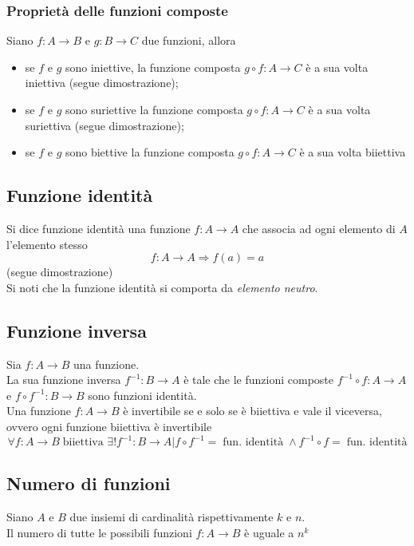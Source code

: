 \begin{flushleft}
\subsubsection{Proprietà delle funzioni composte}
Siano $f:A\to B$ e $g:B \to C$ due funzioni, allora
\begin{itemize}
    \item se $f$ e $g$ sono iniettive, la funzione composta $g\circ f:A\to C$ è a sua volta iniettiva (segue dimostrazione);
    \\ \vspace{300px}
    \item se $f$ e $g$ sono suriettive la funzione composta $g\circ f:A\to C$ è a sua volta suriettiva (segue dimostrazione);
    \\ \vspace{300px}
    \item se $f$ e $g$ sono biettive la funzione composta $g\circ f:A\to C$ è a sua volta biiettiva
\end{itemize}

\subsection{Funzione identità}
Si dice funzione identità una funzione $f:A\to A$ che associa ad ogni elemento di $A$ l'elemento stesso
\[f:A\to A \Rightarrow f(a) = a\]
(segue dimostrazione)
\\ \vspace{300px}
Si noti che la funzione identità si comporta da \textit{elemento neutro}.

\subsection{Funzione inversa}
Sia $f:A\to B$ una funzione.\\
La sua funzione inversa $f^{-1}: B\to A$ è tale che le funzioni composte $f^{-1}\circ f:A\to A$ e  $f\circ f^{-1}:B\to B$ sono funzioni identità.\\
Una funzione $f:A\to B$ è invertibile se e solo se è biiettiva e vale il viceversa, ovvero ogni funzione biiettiva è invertibile
\[\forall f:A\to B\;\text{biiettiva } \exists!f^{-1}:B\to A|f\circ f^{-1} =\; \text{fun. identità}\;\land f^{-1}\circ f =\;\text{fun. identità}\]

\subsection{Numero di funzioni}
Siano $A$ e $B$ due insiemi di cardinalità rispettivamente $k$ e $n$.\\
Il numero di tutte le possibili funzioni $f:A\to B$ è uguale a $n^k$\\


\end{flushleft}
